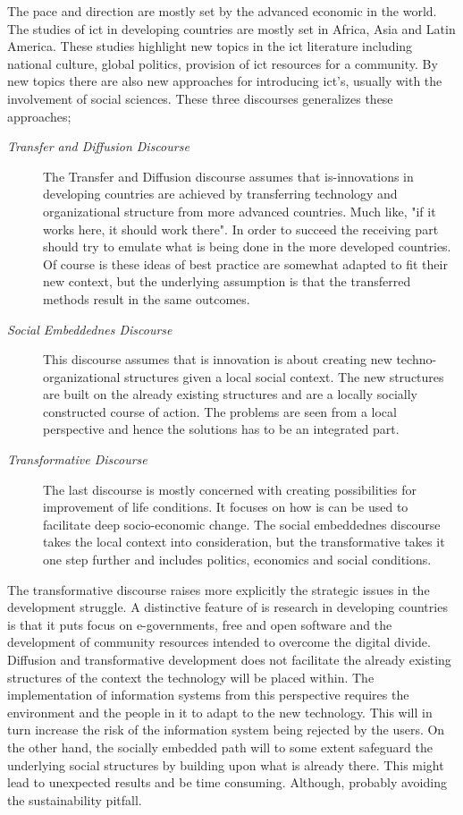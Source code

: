 The pace and direction are mostly set by the advanced economic in the world.
The studies of \gls{ict} in developing countries are mostly set in Africa, Asia and Latin America.
These studies highlight new topics in the \gls{ict} literature including national culture, global politics, provision of \gls{ict} resources for a community.
By new topics there are also new approaches for introducing \gls{ict}'s, usually with the involvement of social sciences.
These three discourses generalizes these approaches;
\begin{description}
\item[\textit{Transfer and Diffusion Discourse}]
	The Transfer and Diffusion discourse assumes that \gls{is}-innovations in developing countries are achieved by transferring technology and organizational structure from more advanced countries. Much like, "if it works here, it should work there". In order to succeed the receiving part should try to emulate what is being done in the more developed countries. Of course \gls{is} these ideas of best practice are somewhat adapted to fit their new context, but the underlying assumption is that the transferred methods result in the same outcomes.
\item[\textit{Social Embeddednes Discourse}]
	This discourse assumes that \gls{is} innovation is about creating new techno-organizational structures given a local social context. The new structures are built on the already existing structures and are a locally socially constructed course of action. The problems are seen from a local perspective and hence the solutions has to be an integrated part.
\item[\textit{Transformative Discourse}]
	The last discourse is mostly concerned with creating possibilities for improvement of life conditions. It focuses on how \gls{is} can be used to facilitate deep socio-economic change.
	The social embeddednes discourse takes the local context into consideration, but the transformative takes it one step further and includes politics, economics and social conditions. 
\end{description}

The transformative discourse raises more explicitly the strategic issues in the development struggle.
A distinctive feature of \gls{is} research in developing countries is that it puts focus on e-governments, free and open software and the development of community resources intended to overcome the digital divide.
Diffusion and transformative development does not facilitate the already existing structures of the context the technology will be placed within.
The implementation of information systems from this perspective requires the environment and the people in it to adapt to the new technology.
This will in turn increase the risk of the information system being rejected by the users. On the other hand, the socially embedded path
will to some extent safeguard the underlying social structures by building upon what is already there. 
This might lead to unexpected results and be time consuming. Although, probably avoiding the sustainability pitfall.

